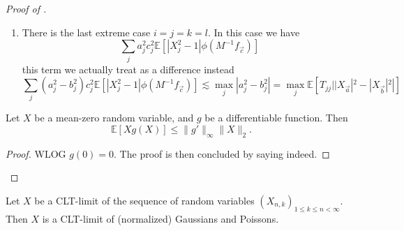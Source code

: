 \documentclass{inprogress}
\begin{document}
\begin{proof}[Proof of ]
\begin{enumerate}
\begin{enumerate}
    and we can sum.
    \item There is the last extreme case $i=j=k=l$. In this case we have
    $$
    \sum_j a_j^2 c_j^2 \mathbb E[|X_j^2 -1| \phi(M^{-1}f_{\vec c}) ]
    $$
    this term we actually treat as a difference instead
    $$
    \sum_j (a_j^2-b_j^2) c_j^2 \mathbb E[|X_j^2 -1| \phi(M^{-1}f_{\vec c}) ]
    \lesssim\max_j |a_j^2-b_j^2| = \max_j \mathbb E[T_{jj}||X_{\vec a}|^2-|X_{\vec b}|^2|]
    $$

    
\end{enumerate}
\end{enumerate}



\begin{lemma}
    Let $X$ be a mean-zero random variable, and $g$ be a differentiable function. Then 
    $$
    \mathbb E[X g(X)] \le \|g'\|_{\infty}\|X\|_2.
    $$
\end{lemma}
\begin{proof}
    WLOG $g(0)=0$. The proof is then concluded by saying indeed.
\end{proof}



\end{proof}

\begin{conjecture}
Let $X$ be a CLT-limit of the sequence of random variables $(X_{n,k})_{1\le k \le n <\infty}$. Then $X$ is a CLT-limit of (normalized) Gaussians and Poissons. 
\end{conjecture}




\end{document}
